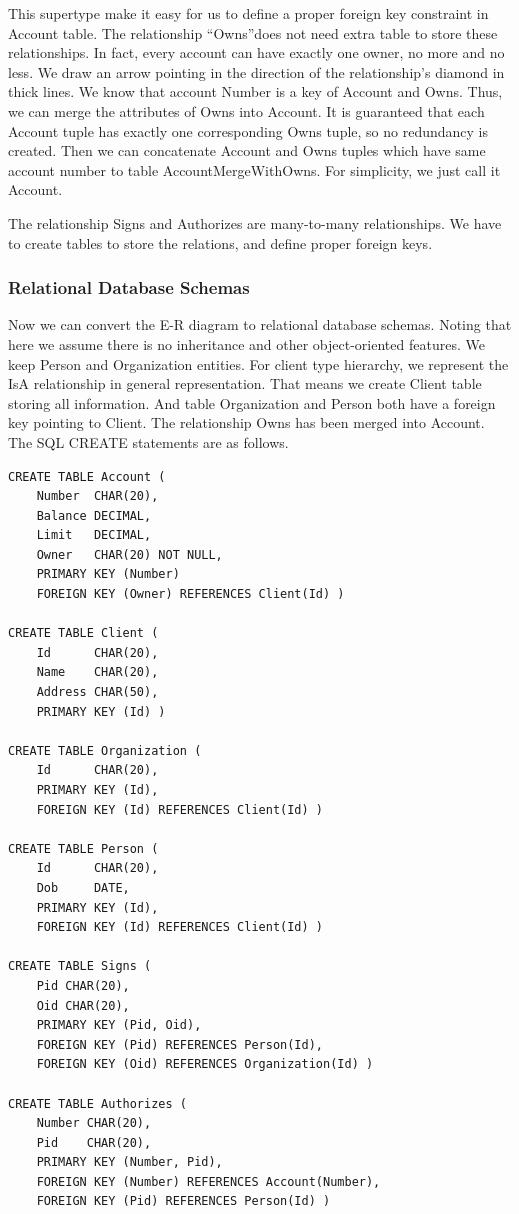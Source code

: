 \documentclass[11pt]{article}
\begin{document}
\par
This supertype make it easy for us to define a proper foreign key constraint in Account table. The relationship ``Owns''does not need extra table to store these relationships. In fact, every account can have exactly one owner, no more and no less. We draw an arrow pointing in the direction of the relationship's diamond in thick lines. We know that account Number is a key of Account and Owns. Thus, we can merge the attributes of Owns into Account. It is guaranteed that each Account tuple has exactly one corresponding Owns tuple, so no redundancy is created. Then we can concatenate Account and Owns tuples which have same account number to table AccountMergeWithOwns. For simplicity, we just call it Account.

\par
The relationship Signs and Authorizes are many-to-many relationships. We have to create tables to store the relations, and define proper foreign keys.

\subsubsection{Relational Database Schemas}
\par
Now we can convert the E-R diagram to relational database schemas. Noting that here we assume there is no inheritance and other object-oriented features. We keep Person and Organization entities. For client type hierarchy, we represent the IsA relationship in general representation. That means we create Client table storing all information. And table Organization and Person both have a foreign key pointing to Client. The relationship Owns has been merged into Account. The SQL CREATE statements are as follows.
\begin{verbatim}
CREATE TABLE Account (
    Number  CHAR(20),
    Balance DECIMAL,
    Limit   DECIMAL,
    Owner   CHAR(20) NOT NULL,
    PRIMARY KEY (Number)
    FOREIGN KEY (Owner) REFERENCES Client(Id) )

CREATE TABLE Client (
    Id      CHAR(20),
    Name    CHAR(20),
    Address CHAR(50),
    PRIMARY KEY (Id) )

CREATE TABLE Organization (
    Id      CHAR(20),
    PRIMARY KEY (Id),
    FOREIGN KEY (Id) REFERENCES Client(Id) )

CREATE TABLE Person (
    Id      CHAR(20),
    Dob     DATE,
    PRIMARY KEY (Id),
    FOREIGN KEY (Id) REFERENCES Client(Id) )

CREATE TABLE Signs (
    Pid CHAR(20),
    Oid CHAR(20),
    PRIMARY KEY (Pid, Oid),
    FOREIGN KEY (Pid) REFERENCES Person(Id),
    FOREIGN KEY (Oid) REFERENCES Organization(Id) )

CREATE TABLE Authorizes (
    Number CHAR(20),
    Pid    CHAR(20),
    PRIMARY KEY (Number, Pid),
    FOREIGN KEY (Number) REFERENCES Account(Number),
    FOREIGN KEY (Pid) REFERENCES Person(Id) )
\end{verbatim}
\end{document}
